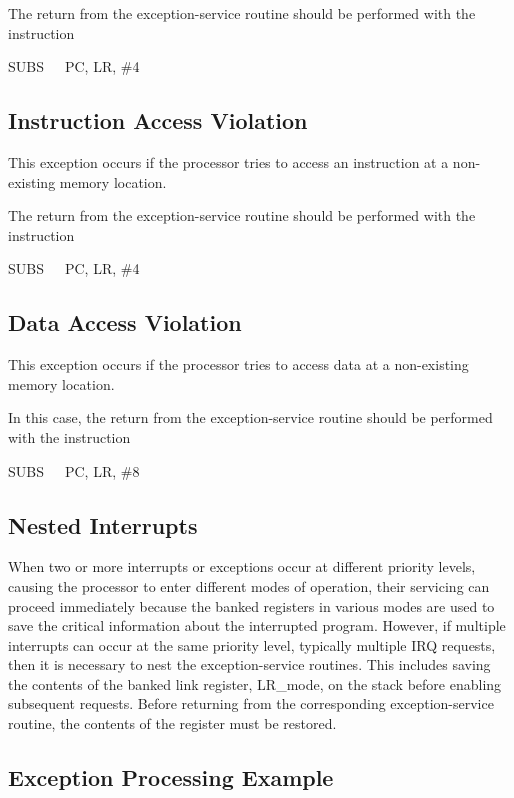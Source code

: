 \documentclass[11pt, twoside, pdftex]{article}
\begin{document}
The return from the exception-service routine should be performed
with the instruction
\begin{center}
SUBS~~~PC, LR, \#4
\end{center}
\noindent

\subsection{Instruction Access Violation}

This exception occurs if the processor tries to access an
instruction at a non-existing memory location.

The return from the exception-service routine should be performed
with the instruction
\begin{center}
SUBS~~~PC, LR, \#4
\end{center}
\noindent

\subsection{Data Access Violation}

This exception occurs if the processor tries to access data
at a non-existing memory location.

In this case, the return from the exception-service routine
should be performed with the instruction
\begin{center}
SUBS~~~PC, LR, \#8
\end{center}
\noindent

\subsection{Nested Interrupts}

When two or more interrupts or exceptions occur at different
priority levels, causing the processor to enter different
modes of operation, their servicing can proceed immediately
because the banked registers in various modes are used to save 
the critical information about the interrupted program.
However, if multiple interrupts can occur at the same priority
level, typically multiple IRQ requests, then it is necessary
to nest the exception-service routines. This includes saving
the contents of the banked link register, LR\_mode,
on the stack before enabling subsequent
requests. Before returning from the corresponding
exception-service routine, the contents of the register must
be restored.

\subsection{Exception Processing Example}
\end{document}
